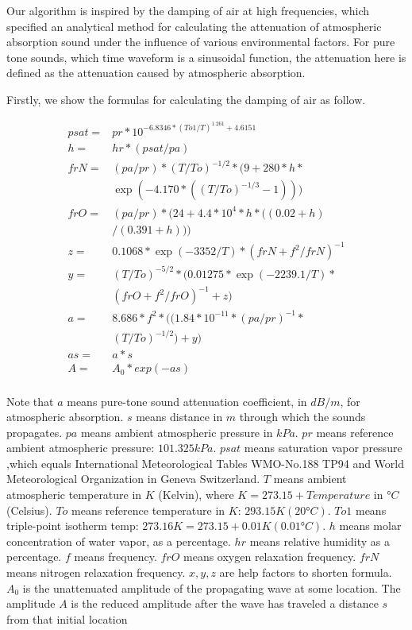 Our algorithm is inspired by the damping of air at high frequencies, which specified an analytical method for calculating the attenuation of atmospheric absorption sound under the influence of various environmental factors. For pure tone sounds, which time waveform is a sinusoidal function, the attenuation here is defined as the attenuation caused by atmospheric absorption.




Firstly, we show the formulas for calculating the damping of air as follow.


\begin{equation}\label{eq:12}
\begin{split}
psat =& pr*10^{-6.8346*(To1/T)^{1.261}+4.6151}\\
h =& hr*(psat/pa)\\
frN =& (pa/pr)*(T/To)^{-1/2}*(9+280*h*\\
     &\exp(-4.170*((T/To)^{-1/3}-1)))\\
frO =& (pa/pr)*(24+4.4*10^4*h*((0.02+h)\\
	 &/(0.391+h)))\\
z =& 0.1068*\exp(-3352/T)*(frN+f^2/frN)^{-1}\\
y = & (T/To)^{-5/2}*(0.01275*\exp(-2239.1/T)*\\&(frO+f^2/frO)^{-1}+z)\\
a = & 8.686*f^2*((1.84*10^{-11}*(pa/pr)^{-1}*\\
	&(T/To)^{-1/2})+y)\\
as = &a*s\\
A = &A_0*exp(-as)\\
\end{split}
\end{equation}

Note that $a$ means pure-tone sound attenuation coefficient, in $dB/m$, for atmospheric absorption.
$s$ means distance in $m$ through which the sounds propagates.
$pa$ means ambient atmospheric pressure in $kPa$.
$pr$ means reference ambient atmospheric pressure: $101.325 kPa$.
$psat$ means saturation vapor pressure ,which equals International Meteorological Tables WMO-No.188 TP94 and World Meteorological Organization in Geneva Switzerland.
$T$ means ambient atmospheric temperature in $K$ (Kelvin), where $ K = 273.15 + Temperature$ in $°C$ (Celsius).
$To$ means reference temperature in $K$: $293.15 K (20°C)$.
$To1$ means triple-point isotherm temp: $273.16 K = 273.15 + 0.01 K (0.01°C)$.
$h$ means molar concentration of water vapor, as a percentage.
$hr$ means relative humidity as a percentage.
$f$ means frequency.
$frO$ means oxygen relaxation frequency.
$frN$ means nitrogen relaxation frequency.
$x, y, z$ are help factors to shorten formula.
$A_0$ is the unattenuated amplitude of the propagating wave at some location. 
The amplitude $A$ is the reduced amplitude after the wave has traveled a distance $s$ from that initial location






